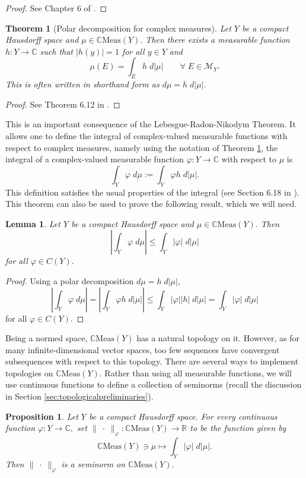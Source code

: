 \documentclass[12pt]{article}
\theoremstyle{theorem}
\newtheorem{theorem}[equation]{Theorem}
\newtheorem{lemma}[equation]{Lemma}
\newtheorem{proposition}[equation]{Proposition}
\theoremstyle{definition}
\numberwithin{equation}{section}
\let\C=\Chi \let\W=\Omega
\def\vf{\varphi}
\newcommand{\be}{\begin{equation}}
\newcommand{\ee}{\end{equation}}
\newcommand{\bt}{\begin{theorem}}
\newcommand{\et}{\end{theorem}}
\newcommand{\blem}{\begin{lemma}}
\newcommand{\elem}{\end{lemma}}
\newcommand{\bn}{\begin{proposition}}
\newcommand{\en}{\end{proposition}}
\newcommand{\bprf}{\begin{proof}}
\newcommand{\eprf}{\end{proof}}
\newcommand{\<}{\langle}
\renewcommand{\>}{\rangle}
\def\R{{{\mathbb R}}}
\def\C{{{\mathbb C}}}
\begin{document}
\bprf
See Chapter 6 of \cite{Ru87}. 
\eprf

\bt
[Polar decomposition for complex measures]
\label{thm:polardecompofmeasure}
Let $Y$ be a compact Hausdorff space and $\mu\in\C\mathrm{Meas}(Y).$ 
Then there exists a measurable function $h:Y\to\C$ such that
$|h(y)|=1$ for all $y\in Y$ and 
\be
\mu(E)=\int_{E}h\;d|\mu|\qquad\forall\;E\in\mathcal{M}_{Y}.
\ee
This is often written in shorthand form as 
$d\mu=h\;d|\mu|.$
\et

\bprf
See Theorem 6.12 in \cite{Ru87}. 
\eprf

This is an important consequence of the
Lebesgue-Radon-Nikodym Theorem.
It allows one to define the integral of complex-valued 
measurable functions with respect to complex measures, 
namely using the notation of 
Theorem \ref{thm:polardecompofmeasure}, the integral of 
a complex-valued measurable function $\vf:Y\to\C$ with respect to $\mu$ is
\be
\int_{Y}\vf\;d\mu:=\int_{Y}\vf h\;d|\mu|. 
\ee
This definition satisfies the usual properties of the integral 
(see Section 6.18 in \cite{Ru87}). 
This theorem can also be used to prove the following result, which we will need.

\blem
\label{lem:absvalueonintegral}
Let $Y$ be a compact Hausdorff space and $\mu\in\C\mathrm{Meas}(Y).$ 
Then 
\be
\left|\int_{Y}\vf\;d\mu\right|\le\int_{Y}|\vf|\;d|\mu|
\ee
for all $\vf\in C(Y).$ 
\elem

\bprf
Using a polar decomposition $d\mu=h\;d|\mu|,$ 
\be
\left|\int_{Y}\vf\;d\mu\right|=\left|\int_{Y}\vf h\;d|\mu|\right|
\le\int_{Y}|\vf||h|\;d|\mu|=\int_{Y}|\vf|\;d|\mu|
\ee
for all $\vf\in C(Y).$ 
\eprf

Being a normed space, $\C\mathrm{Meas}(Y)$ has a natural topology on it. 
However, as for many infinite-dimensional vector spaces, too few sequences
have convergent subsequences with respect to this topology. There are several
ways to implement topologies on $\C\mathrm{Meas}(Y).$ Rather than using
all measurable functions, we will use continuous functions to define a collection
of seminorms (recall the discussion in Section 
\ref{sec:topologicalpreliminaries}). 

\bn
\label{prop:seminormonmeasures}
Let $Y$ be a compact Hausdorff space. For every continuous function $\vf:Y\to\C,$
set $\lVert\;\cdot\;\rVert_{\vf}:\C\mathrm{Meas}(Y)\to\R$ to be the function given by
\be
\C\mathrm{Meas}(Y)\ni\mu\mapsto\int_{Y}|\vf|\;d|\mu|. 
\ee 
Then $\lVert\;\cdot\;\rVert_{\vf}$ is a seminorm on $\C\mathrm{Meas}(Y).$ 
\en
\end{document}
